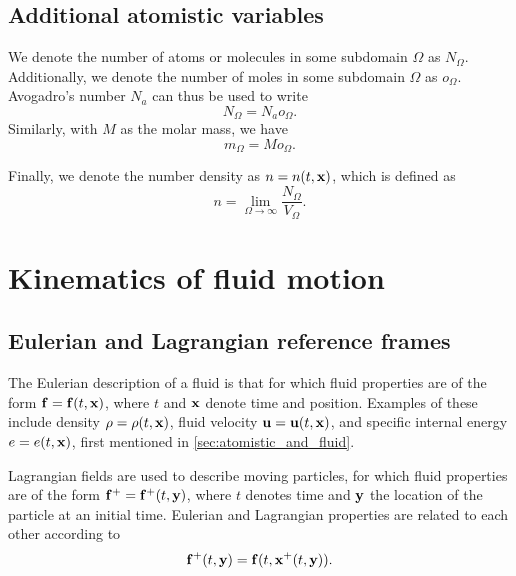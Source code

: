 \documentclass[oneside,a4paper,11pt]{report}
\begin{document}
\section{Additional atomistic variables}
We denote the number of atoms or molecules in some subdomain $\Omega$ as $N_\Omega$. Additionally, we denote the number of moles in some subdomain $\Omega$ as $o_\Omega$. Avogadro's number $N_a$ can thus be used to write 
\begin{equation}
    \label{eq:atomistic_particles_moles}
    N_\Omega = N_a o_\Omega.
\end{equation}
Similarly, with $M$ as the molar mass, we have
\begin{equation}
    \label{eq:atomistic_mass_moles}
    m_\Omega = M o_\Omega.
\end{equation}

Finally, we denote the number density as $n = n(t,\mathbf{x})$, which is defined as
\begin{equation}
    \label{eq:atomistic_number_density}
    n = \lim_{\Omega \to \infty} \frac{N_\Omega}{V_\Omega}.
\end{equation}

\chapter{Kinematics of fluid motion}

\section{Eulerian and Lagrangian reference frames}
The Eulerian description of a fluid is that for which fluid properties are of the form $\mathbf{f} = \mathbf{f}(t,\mathbf{x})$, where $t$ and $\mathbf{x}$ denote time and position. Examples of these include density $\rho = \rho(t,\mathbf{x})$, fluid velocity $\mathbf{u} = \mathbf{u}(t,\mathbf{x})$, and specific internal energy $e = e(t, \mathbf{x})$, first mentioned in \cref{sec:atomistic_and_fluid}.

Lagrangian fields are used to describe moving particles, for which fluid properties are of the form $\mathbf{f}^+ = \mathbf{f}^+(t,\mathbf{y})$, where $t$ denotes time and $\mathbf{y}$ the location of the particle at an initial time. Eulerian and Lagrangian properties are related to each other according to 
\begin{equation}
\mathbf{f}^+(t,\mathbf{y})=\mathbf{f}(t,\mathbf{x}^+(t,\mathbf{y})).
\end{equation}
\end{document}
